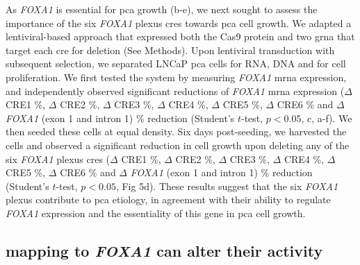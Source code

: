 As \emph{FOXA1} is essential for \gls{pca} growth (b-e), we next sought to assess the importance of the six \emph{FOXA1} plexus \glspl{cre} towards \gls{pca} cell growth.
We adapted a lentiviral-based approach that expressed both the Cas9 protein and two \gls{grna} that target each \gls{cre} for deletion (See Methods).
Upon lentiviral transduction with subsequent selection, we separated LNCaP \gls{pca} cells for RNA, DNA and for cell proliferation.
We first tested the system by measuring \emph{FOXA1} \gls{mrna} expression, and independently observed significant reductions of \emph{FOXA1} \gls{mrna} expression ($\Delta$ CRE1 \%, $\Delta$ CRE2 \%, $\Delta$ CRE3 \%, $\Delta$ CRE4 \%, $\Delta$ CRE5 \%, $\Delta$ CRE6 \% and $\Delta$ \emph{FOXA1} (exon 1 and intron 1) \% reduction (Student's $t$-test, $p<0.05$, c, a-f).
We then seeded these cells at equal density.
Six days post-seeding, we harvested the cells and observed a significant reduction in cell growth upon deleting any of the six \emph{FOXA1} plexus \glspl{cre} ($\Delta$ CRE1 \%, $\Delta$ CRE2 \%, $\Delta$ CRE3 \%, $\Delta$ CRE4 \%, $\Delta$ CRE5 \%, $\Delta$ CRE6 \% and $\Delta$ \emph{FOXA1} (exon 1 and intron 1) \% reduction (Student's $t$-test, $p<0.05$, Fig 5d).
These results suggest that the six \emph{FOXA1} plexus contribute to \gls{pca} etiology, in agreement with their ability to regulate \emph{FOXA1} expression and the essentiality of this gene in \gls{pca} cell growth.

\subsection{ mapping to \emph{FOXA1}  can alter their activity}


